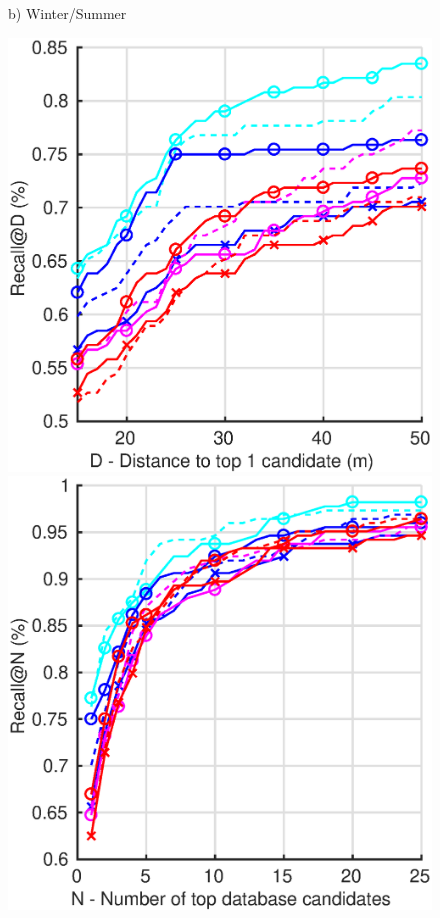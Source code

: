 \begin{figure}
\begin{minipage}{0.85\linewidth}
\begin{minipage}{0.49\linewidth}
		{\scriptsize b) Winter/Summer}
	\end{minipage}
	
	\begin{minipage}{0.49\linewidth}
		\center
		\includegraphics[width=0.49\linewidth]{plot/fig/lt_distance}	
		\includegraphics[width=0.49\linewidth]{plot/fig/lt_recall}


\end{minipage}
\end{minipage}
\end{figure}

